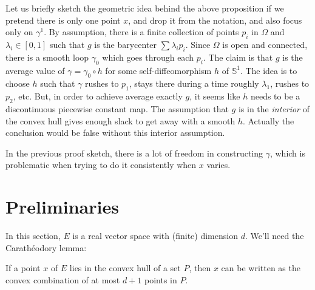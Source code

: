 Let us briefly sketch the geometric idea behind the above proposition
if we pretend there is only one point $x$, and drop it from the
notation, and also focus only on $γ^1$.
By assumption, there is a finite collection of points $p_i$ in $Ω$ and $λ_i ∈
[0, 1]$ such that $g$ is the barycenter $\sum λ_i p_i$. Since $Ω$ is open and
connected, there is a smooth loop $γ_0$ which goes through each $p_i$. The
claim is that $g$ is the average value of $γ = γ_0 ∘ h$ for some
self-diffeomorphism $h$ of $𝕊^1$. The idea is to choose $h$ such that
$γ$ rushes to $p_1$, stays there during a time roughly $λ_1$, rushes to
$p_2$, etc. But, in order to achieve average exactly $g$, it seems like $h$
needs to be a discontinuous piecewise constant map. The assumption that $g$ is
in the \emph{interior} of the convex hull gives enough slack to get away with
a smooth $h$.  Actually the
conclusion would be false without this interior assumption.

In the previous proof sketch, there is a lot of freedom in constructing $γ$,
which is problematic when trying to do it consistently when $x$ varies.

\section{Preliminaries}
\label{sec:preliminaries}

In this section, $E$ is a real vector space with (finite) dimension $d$.
We'll need the Carathéodory lemma:

\begin{lemma}
\label{lem:caratheodory}
\leanok
  If a point $x$ of $E$ lies in the convex hull of a set $P$, then $x$
  can be written as the convex combination of at most $d + 1$ points in
  $P$.
\end{lemma}

